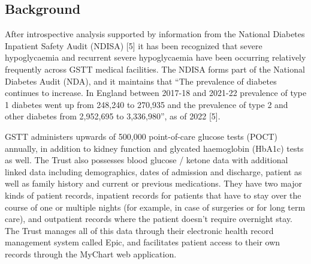 \subsection{Background} 
\par{\noindent After introspective analysis supported by information from the National Diabetes Inpatient Safety Audit (NDISA) [5] it has been recognized that severe hypoglycaemia and recurrent severe hypoglycaemia have been occurring relatively frequently across GSTT medical facilities. The NDISA forms part of the National Diabetes Audit (NDA), and it maintains that “The prevalence of diabetes continues to increase. In England between 2017-18 and 2021-22 prevalence of type 1 diabetes went up from 248,240 to 270,935 and the prevalence of type 2 and other diabetes from 2,952,695 to 3,336,980”, as of 2022 [5]. }

\vspace{10pt}
\par{\noindent GSTT administers upwards of 500,000 point-of-care glucose tests (POCT) annually, in addition to kidney function and glycated haemoglobin (HbA1c) tests as well. The Trust also possesses blood glucose / ketone data with additional linked data including demographics, dates of admission and discharge, patient as well as family history and current or previous medications. They have two major kinds of patient records, inpatient records for patients that have to stay over the course of one or multiple nights (for example, in case of surgeries or for long term care), and outpatient records where the patient doesn’t require overnight stay. The Trust manages all of this data through their electronic health record management system called Epic, and facilitates patient access to their own records through the MyChart web application.}

